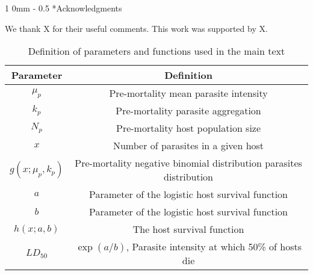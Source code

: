 \documentclass[12pt, a4paper]{article}
\makeatletter
\renewcommand{\section}{\@startsection
{section}%
{1}%
{0mm}%
{-\baselineskip}%
{0.5\baselineskip}%
{\normalfont\bf\large}} %
\makeatother
\begin{document}
\section*{Acknowledgments}

We thank X for their useful comments. This work was supported by X.

\singlespacing



\newpage

\renewcommand{\arraystretch}{1.2}

\begin{table}

    \caption{Definition of parameters and functions used in the main text}
    \begin{tabular}{c c}
    \hline
    Parameter & Definition \\
    \hline\hline
    $\mu_p$ & Pre-mortality mean parasite intensity \\
    $k_p$   & Pre-mortality parasite aggregation \\
    $N_p$   & Pre-mortality host population size \\
    $x$     & Number of parasites in a given host \\
    $g(x; \mu_p, k_p)$ & Pre-mortality negative binomial distribution parasites distribution \\
    $a$ & Parameter of the logistic host survival function \\
    $b$ & Parameter of the logistic host survival function \\
    $h(x; a, b)$ & The host survival function \\
    $LD_{50}$ & $\exp(a / b)$, Parasite intensity at which 50\% of hosts die \\

    \end{tabular}
    \label{tab:params}
\end{table}
\end{document}
